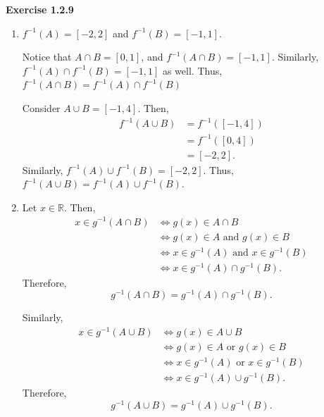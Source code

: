\documentclass[12pt]{article}
\begin{document}
\noindent \textbf{Exercise 1.2.9}
\begin{enumerate}
      \item [(a)]
            $f^{-1}(A) = [-2, 2]$ and $f^{-1}(B) = [-1, 1]$.

            Notice that $A \cap B = [0, 1]$, and $f^{-1}(A \cap B) = [-1, 1]$.
            Similarly, $f^{-1}(A) \cap f^{-1}(B) = [-1,1]$ as well.
            Thus, $ f^{-1}(A \cap B) = f^{-1}(A) \cap f^{-1}(B) $

            Consider $A \cup B = [-1, 4]$. Then,
            \begin{align*}
                  f^{-1}(A \cup B) & = f^{-1}([-1, 4]) \\
                                   & = f^{-1}([0,4])   \\
                                   & = [-2, 2].
            \end{align*}
            Similarly, $f^{-1}(A) \cup f^{-1}(B) = [-2, 2]$.
            Thus, $ f^{-1}(A \cup B) = f^{-1}(A) \cup f^{-1}(B) $.
      \item [(b)]
            Let $x \in \mathbb{R}$. Then,
            \begin{align*}
                  x \in g^{-1}(A \cap B)
                   & \iff g(x) \in A \cap B                            \\
                   & \iff g(x) \in A \text{ and } g(x) \in B           \\
                   & \iff x \in g^{-1}(A) \text{ and } x \in g^{-1}(B) \\
                   & \iff x \in g^{-1}(A) \cap g^{-1}(B).
            \end{align*}
            Therefore,
            \[
                  g^{-1}(A \cap B)
                  = g^{-1}(A) \cap g^{-1}(B).
            \]

            Similarly,
            \begin{align*}
                  x \in g^{-1}(A \cup B)
                   & \iff g(x) \in A \cup B                           \\
                   & \iff g(x) \in A \text{ or } g(x) \in B           \\
                   & \iff x \in g^{-1}(A) \text{ or } x \in g^{-1}(B) \\
                   & \iff x \in g^{-1}(A) \cup g^{-1}(B).
            \end{align*}
            Therefore,
            \[
                  g^{-1}(A \cup B)
                  = g^{-1}(A) \cup g^{-1}(B).
            \]

\end{enumerate}
\end{document}
